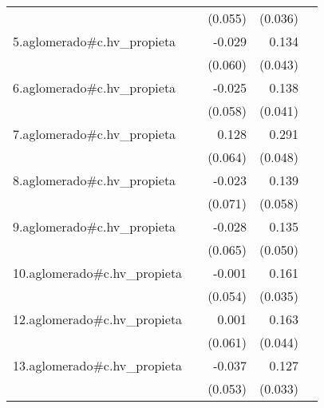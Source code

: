 {\begin{longtable}{l*{4}{D{.}{.}{-1}}}
            &                     &     (0.055)         &     (0.036)         &                     \\
\addlinespace
5.aglomerado#c.hv\_propieta&                     &      -0.029         &       0.134\sym{**} &                     \\
            &                     &     (0.060)         &     (0.043)         &                     \\
\addlinespace
6.aglomerado#c.hv\_propieta&                     &      -0.025         &       0.138\sym{***}&                     \\
            &                     &     (0.058)         &     (0.041)         &                     \\
\addlinespace
7.aglomerado#c.hv\_propieta&                     &       0.128\sym{*}  &       0.291\sym{***}&                     \\
            &                     &     (0.064)         &     (0.048)         &                     \\
\addlinespace
8.aglomerado#c.hv\_propieta&                     &      -0.023         &       0.139\sym{*}  &                     \\
            &                     &     (0.071)         &     (0.058)         &                     \\
\addlinespace
9.aglomerado#c.hv\_propieta&                     &      -0.028         &       0.135\sym{**} &                     \\
            &                     &     (0.065)         &     (0.050)         &                     \\
\addlinespace
10.aglomerado#c.hv\_propieta&                     &      -0.001         &       0.161\sym{***}&                     \\
            &                     &     (0.054)         &     (0.035)         &                     \\
\addlinespace
12.aglomerado#c.hv\_propieta&                     &       0.001         &       0.163\sym{***}&                     \\
            &                     &     (0.061)         &     (0.044)         &                     \\
\addlinespace
13.aglomerado#c.hv\_propieta&                     &      -0.037         &       0.127\sym{***}&                     \\
            &                     &     (0.053)         &     (0.033)         &                     \\

\end{longtable}}
